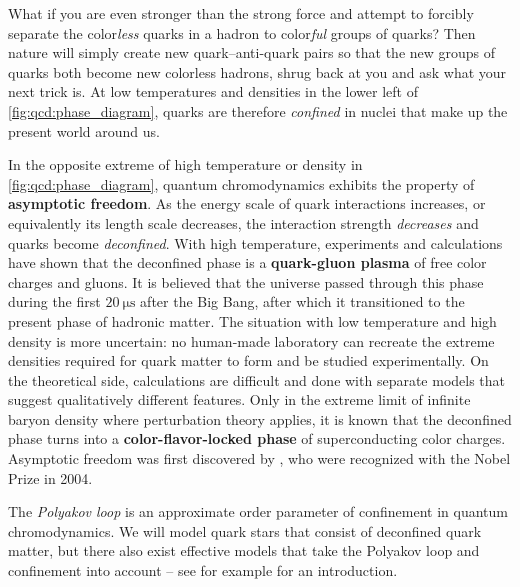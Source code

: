 What if you are even stronger than the strong force and attempt to forcibly separate the color\emph{less} quarks in a hadron to color\emph{ful} groups of quarks?
Then nature will simply create new quark--anti-quark pairs so that the new groups of quarks both become new colorless hadrons,
shrug back at you and ask what your next trick is.
At low temperatures and densities in the lower left of \cref{fig:qcd:phase_diagram}, quarks are therefore \emph{confined}
in nuclei that make up the present world around us.

In the opposite extreme of high temperature or density in \cref{fig:qcd:phase_diagram}, quantum chromodynamics exhibits the property of \textbf{asymptotic freedom}.
As the energy scale of quark interactions increases, or equivalently its length scale decreases, the interaction strength \emph{decreases} and quarks become \emph{deconfined}.
With high temperature, experiments and calculations have shown that the deconfined phase is a \textbf{quark-gluon plasma} of free color charges and gluons.
It is believed that the universe passed through this phase during the first $\SI{20}{\micro\second}$ after the Big Bang, after which it transitioned to the present phase of hadronic matter.
The situation with low temperature and high density is more uncertain:
no human-made laboratory can recreate the extreme densities required for quark matter to form and be studied experimentally.
On the theoretical side, calculations are difficult and done with separate models that suggest qualitatively different features.
Only in the extreme limit of infinite baryon density where perturbation theory applies,
it is known that the deconfined phase turns into a \textbf{color-flavor-locked phase} of superconducting color charges. \cite{ref:qcd_phase_diagram_dense}
Asymptotic freedom was first discovered by \cite{ref:asymptotic_freedom_gross_wilczek,ref:asymptotic_freedom_politzer}, who were recognized with the Nobel Prize in 2004.

The \emph{Polyakov loop} is an approximate order parameter of confinement in quantum chromodynamics.
We will model quark stars that consist of deconfined quark matter,
but there also exist effective models that take the Polyakov loop and confinement into account
-- see for example \cite{ref:master_folkestad} for an introduction.


